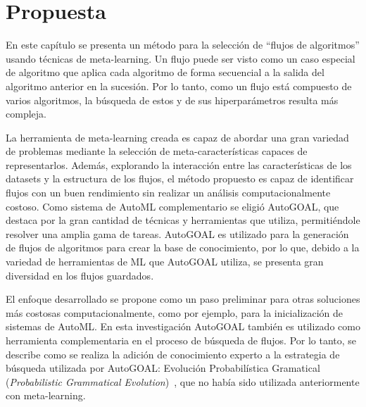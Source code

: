 \chapter{Propuesta}\label{chapter:proposal}


%

En este capítulo se presenta un método para la selección de ``flujos de algoritmos'' usando técnicas de meta-learning. Un flujo puede ser visto como un caso especial de algoritmo que aplica cada algoritmo de forma secuencial a la salida del algoritmo anterior en la sucesión. Por lo tanto, como un flujo está compuesto de varios algoritmos, la búsqueda de estos y de sus hiperparámetros resulta más compleja. 

La herramienta de meta-learning creada es capaz de abordar una gran variedad de problemas mediante la selección de meta-características capaces de representarlos. Además, explorando la interacción entre las características de los datasets y la estructura de los flujos, el método propuesto es capaz de identificar flujos con un buen rendimiento sin realizar un análisis computacionalmente costoso. Como sistema de AutoML complementario se eligió AutoGOAL, que destaca por la gran cantidad de técnicas y herramientas que utiliza, permitiéndole resolver una amplia gama de tareas. AutoGOAL es utilizado para la generación de flujos de algoritmos para crear la base de conocimiento, por lo que, debido a la variedad de herramientas de ML que AutoGOAL utiliza, se presenta gran diversidad en los flujos guardados.


El enfoque desarrollado se propone como un paso preliminar para otras soluciones más costosas computacionalmente, como por ejemplo, para la inicialización de sistemas de AutoML. En esta investigación AutoGOAL también es utilizado como herramienta complementaria en el proceso de búsqueda de flujos. Por lo tanto, se describe como se realiza la adición de conocimiento experto a la estrategia de búsqueda utilizada por AutoGOAL: Evolución Probabilística Gramatical (\textit{Probabilistic Grammatical Evolution})~\cite{pge2015}, que no había sido utilizada anteriormente con meta-learning.


